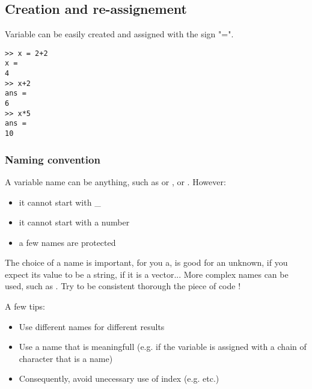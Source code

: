 \subsection{Creation and re-assignement}

Variable can be easily created and assigned with the sign "=". 


\begin{lstlisting}
>> x = 2+2
x =
4
>> x+2
ans =
6
>> x*5
ans =
10
\end{lstlisting}


\subsubsection{Naming convention}
A variable name can be anything, such as  or  , or   .
However:
\begin{itemize}
	\item it cannot start with \_
	\item it cannot start with a number
	\item a few names are protected
\end{itemize}


The choice of a name is important, for you a,  is good for an unknown,  if you expect its value to be a string,  if it is a vector... More complex names can be used, such as . Try to be consistent thorough the piece of code !

A few tips:

\begin{itemize}
	\item Use different names for different results
	\item Use a name that is meaningfull (e.g.  if the variable is assigned with a chain of character that is a name)
	\item Consequently, avoid unecessary use of index (e.g.  etc.)
\end{itemize}



